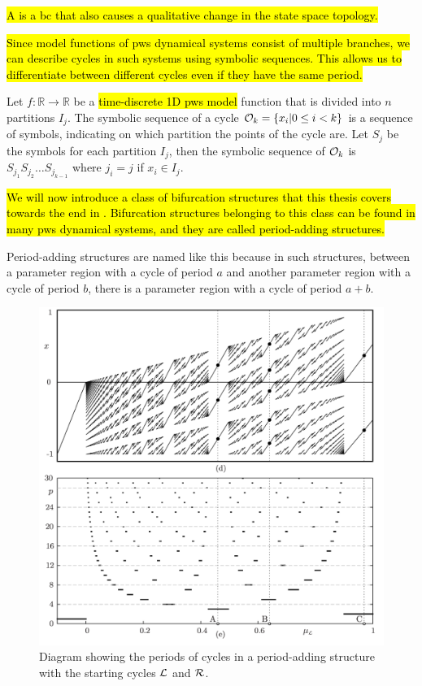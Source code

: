 \begin{definition}
	\hl{
		A  is a \gls{bc} that also causes a qualitative change in the state space topology.
	}
\end{definition}

\hl{
	Since model functions of \gls{pws} dynamical systems consist of multiple branches, we can describe cycles in such systems using symbolic sequences.
	This allows us to differentiate between different cycles even if they have the same period.
}


\begin{definition}
	Let $f: \mathbb{R} \to \mathbb{R}$ be a \hl{time-discrete 1D \gls{pws} model} function that is divided into $n$ partitions $I_j$.
	The symbolic sequence of a cycle $\mathcal{O}_k = \{x_i | 0 \leq i < k\}$ is a sequence of symbols, indicating on which partition the points of the cycle are.
	Let $S_j$ be the symbols for each partition $I_j$, then the symbolic sequence of $\mathcal{O}_k$ is $S_{j_1} S_{j_2} \dots S_{j_{k-1}}$ where $j_i = j$ if $x_i \in I_j$.
\end{definition}

\hl{
	We will now introduce a class of bifurcation structures that this thesis covers towards the end in .
	Bifurcation structures belonging to this class can be found in many \gls{pws} dynamical systems, and they are called period-adding structures.
}

Period-adding structures are named like this because in such structures, between a parameter region with a cycle of period $a$ and another parameter region with a cycle of period $b$, there is a parameter region with a cycle of period $a + b$.

\begin{figure}
	\centering
	\includegraphics[width=.5 \textwidth]{../StatusMeeting/02/Figs/PeriodAddingDiagrams_Slides.png}
	\caption[Diagram of periods in a period-adding structure between $\L$ and $\R$]{
		Diagram showing the periods of cycles in a period-adding structure with the starting cycles $\L$ and $\R$.
	}
\end{figure}

